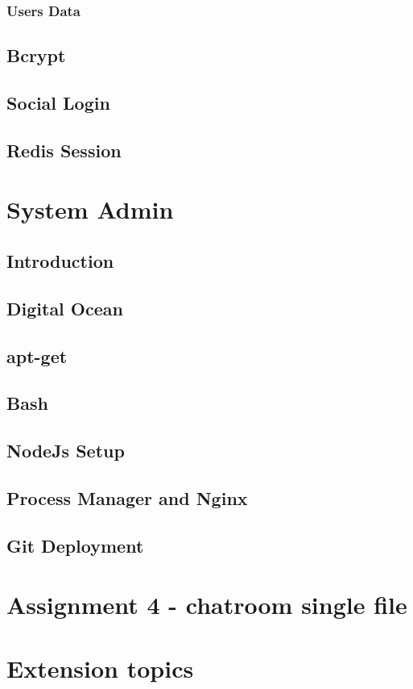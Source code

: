\documentclass[a4paper]{article}
\begin{document}
\subsubsection{Users Data}

\subsection{Bcrypt}
\subsection{Social Login}
\subsection{Redis Session}

\section{System Admin}
\subsection{Introduction}
\subsection{Digital Ocean}
\subsection{apt-get}
\subsection{Bash}
\subsection{NodeJs Setup}
\subsection{Process Manager and Nginx}
\subsection{Git Deployment}

\section{Assignment 4 - chatroom single file}

\section{Extension topics}
\end{document}
